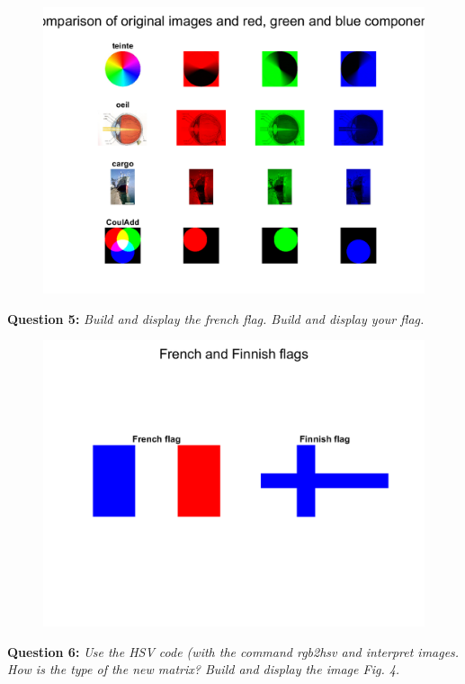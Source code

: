 \begin{figure}[H]
    \centering
    \includegraphics[width=\linewidth]{Doc/Graphics/Part1/Part1_Question4a.png}
    \label{fig:enter-label}
\end{figure}



\textbf{Question 5:}
\textit{Build and display the french ﬂag. Build and display your ﬂag.}

\begin{figure}[H]
    \centering
    \includegraphics[width=0.5\linewidth]{Doc/Graphics/Part1/Part1_Question5.png}
    \label{fig:enter-label}
\end{figure}



\textbf{Question 6:}
\textit{Use the HSV code (with the command rgb2hsv and interpret images. How is the type of the new matrix? Build and display the image Fig. 4.}


